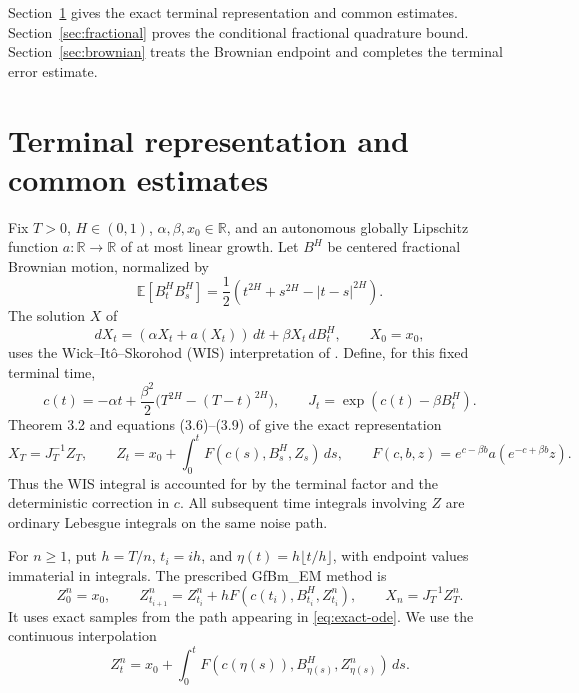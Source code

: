 \documentclass[11pt]{article}
\theoremstyle{remark}
\newcommand{\E}{\mathbb E}
\newcommand{\R}{\mathbb R}
\newcommand{\abs}[1]{\lvert#1\rvert}
\begin{document}
Section~\ref{sec:setup} gives the exact terminal representation and
common estimates. Section~\ref{sec:fractional} proves the conditional
fractional quadrature bound. Section~\ref{sec:brownian} treats the
Brownian endpoint and completes the terminal error estimate.


\section{Terminal representation and common estimates}\label{sec:setup}

Fix \(T>0\), \(H\in(0,1)\), \(\alpha,\beta,x_0\in\R\), and an autonomous
globally Lipschitz function \(a:\R\to\R\) of at most linear growth.
Let \(B^H\) be centered fractional Brownian motion, normalized by
\[
 \E[B^H_tB^H_s]=\frac12(t^{2H}+s^{2H}-\abs{t-s}^{2H}).
\]
The solution \(X\) of
\begin{equation}\label{eq:sde}
 dX_t=(\alpha X_t+a(X_t))\,dt+\beta X_t\,dB^H_t,\qquad X_0=x_0,
\end{equation}
uses the Wick--It\^o--Skorohod (WIS) interpretation of
\cite{ELS}. Define, for this fixed terminal time,
\begin{equation}\label{eq:factor}
 c(t)=-\alpha t+\frac{\beta^2}{2}\bigl(T^{2H}-(T-t)^{2H}\bigr),
 \qquad J_t=\exp(c(t)-\beta B^H_t).
\end{equation}
Theorem 3.2 and equations (3.6)--(3.9) of \cite{ELS} give the exact
representation
\begin{equation}\label{eq:exact-ode}
 X_T=J_T^{-1}Z_T,\qquad
 Z_t=x_0+\int_0^t F(c(s),B^H_s,Z_s)\,ds,\qquad
 F(c,b,z)=e^{c-\beta b}a(e^{-c+\beta b}z).
\end{equation}
Thus the WIS integral is accounted for by the terminal factor and the
deterministic correction in \(c\). All subsequent time integrals involving
\(Z\) are ordinary Lebesgue integrals on the same noise path.

For \(n\ge1\), put \(h=T/n\), \(t_i=ih\), and
\(\eta(t)=h\lfloor t/h\rfloor\), with endpoint values immaterial in integrals.
The prescribed GfBm\_EM method is
\begin{equation}\label{eq:scheme}
 Z^n_0=x_0,\qquad
 Z^n_{t_{i+1}}=Z^n_{t_i}+hF(c(t_i),B^H_{t_i},Z^n_{t_i}),\qquad
 X_n=J_T^{-1}Z^n_T .
\end{equation}
It uses exact samples from the path appearing in \eqref{eq:exact-ode}.
We use the continuous interpolation
\begin{equation}\label{eq:interpolation}
 Z^n_t=x_0+\int_0^t F(c(\eta(s)),B^H_{\eta(s)},Z^n_{\eta(s)})\,ds.
\end{equation}
\end{document}
